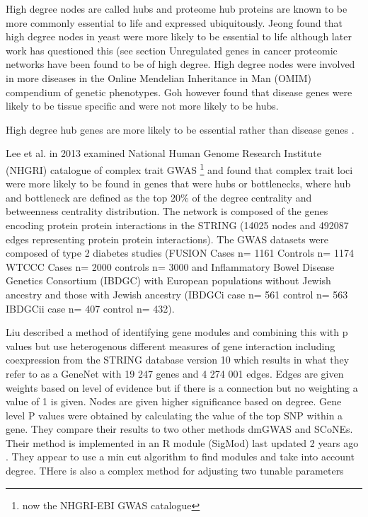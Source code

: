 High degree nodes are called hubs and proteome hub proteins are known to be more commonly essential to life \cite{jeong2001lethality} and expressed ubiquitously. \cite{goh2007human}  Jeong found that high degree nodes in yeast were more likely to be essential to life \cite{jeong2001lethality} although later work has questioned this (see section Unregulated genes in cancer proteomic networks have been found to be of high degree. \cite{wachi2005interactome}  High degree nodes were  involved in more diseases in the Online Mendelian Inheritance in Man (OMIM) compendium of genetic phenotypes. \cite{xu2006discovering}  Goh however found that disease genes were likely to be tissue specific and were not more likely to be hubs. \cite{goh2007human}  
 
High degree hub genes are more likely to be essential rather than disease genes \cite{barabasi2011network}. 

Lee et al. \cite{lee2013network} in 2013 examined National Human Genome Research Institute (NHGRI)  catalogue of complex trait GWAS \footnote{now the NHGRI-EBI GWAS catalogue} and found that complex trait loci were more likely to be found in genes that were hubs or bottlenecks, where hub and bottleneck are defined as the top 20\% of the degree centrality and betweenness centrality distribution.  The network is composed of the genes encoding protein protein interactions in the STRING (14025 nodes and 492087 edges representing protein protein interactions). The GWAS datasets were composed of type 2 diabetes studies (FUSION  Cases n=	1161 Controls n=	1174 
WTCCC Cases n=	2000 controls n=	3000  and Inflammatory Bowel Disease Genetics Consortium (IBDGC) with European populations without Jewish ancestry and those with Jewish ancestry (IBDGCi case n=	561 control n=	563 IBDGCii case n= 	407 control n=	432).  

Liu \cite{liu2017sigmod} described a method of identifying gene modules and combining this with p values but use heterogenous different measures of gene interaction including coexpression from the STRING database version 10 which results in what they refer to as a GeneNet  with 19 247 genes and 4 274 001 edges. Edges are given weights based on level of evidence but if there is a connection but no weighting a value of 1 is given. Nodes are given higher significance based on degree.  Gene level P values were obtained by calculating the value of the top SNP within a gene. They compare their results to two other methods dmGWAS and SCoNEs. Their method is implemented in an R module (SigMod) last updated 2 years ago . They appear to use a min cut algorithm to find modules and take into account degree. THere is also a complex method for adjusting two tunable parameters 



